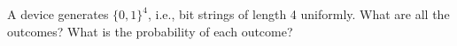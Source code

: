 A device generates $\{0,1\}^4$, i.e., bit strings of length 4 uniformly. 
What are all the outcomes?
What is the probability of each outcome?
